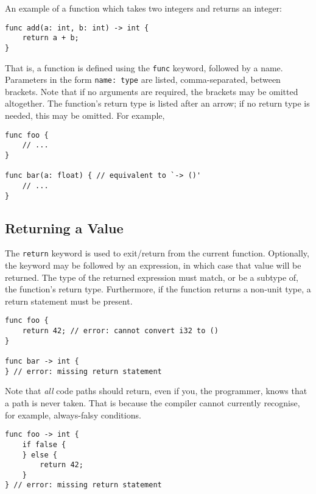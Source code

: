 \documentclass{article}
\begin{document}
    An example of a function which takes two integers and returns an integer:
    \begin{lstlisting}[language=CustomLang]
func add(a: int, b: int) -> int {
    return a + b;
}
    \end{lstlisting}

    That is, a function is defined using the \texttt{func} keyword, followed by a name.
    Parameters in the form \texttt{name: type} are listed, comma-separated, between brackets.
    Note that if no arguments are required, the brackets may be omitted altogether.
    The function's return type is listed after an arrow; if no return type is needed, this may be omitted.
    For example,
    \begin{lstlisting}[language=CustomLang]
func foo {
    // ...
}

func bar(a: float) { // equivalent to `-> ()'
    // ...
}
    \end{lstlisting}

    \subsection{Returning a Value}

    The \texttt{return} keyword is used to exit/return from the current function.
    Optionally, the keyword may be followed by an expression, in which case that value will be returned.
    The type of the returned expression must match, or be a subtype of, the function's return type.
    Furthermore, if the function returns a non-unit type, a return statement must be present.

    \begin{lstlisting}[language=CustomLang]
func foo {
    return 42; // error: cannot convert i32 to ()
}

func bar -> int {
} // error: missing return statement
    \end{lstlisting}

    Note that \textit{all} code paths should return, even if you, the programmer, knows that a path is never taken.
    That is because the compiler cannot currently recognise, for example, always-falsy conditions.

    \begin{lstlisting}[language=CustomLang]
func foo -> int {
    if false {
    } else {
        return 42;
    }
} // error: missing return statement
    \end{lstlisting}
\end{document}
